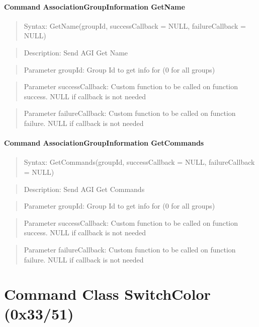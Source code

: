 \paragraph{Command AssociationGroupInformation GetName}
\begin{quote}Syntax: GetName(groupId, successCallback = NULL, failureCallback = NULL)\end{quote}
\begin{quote}Description: Send AGI Get Name\end{quote}
\begin{quote}Parameter groupId: Group Id to get info for (0 for all groups)\end{quote}
\begin{quote}Parameter successCallback: Custom function to be called on function success. NULL if callback is not needed\end{quote}
\begin{quote}Parameter failureCallback: Custom function to be called on function failure. NULL if callback is not needed\end{quote}


\paragraph{Command AssociationGroupInformation GetCommands}
\begin{quote}Syntax: GetCommands(groupId, successCallback = NULL, failureCallback = NULL)\end{quote}
\begin{quote}Description: Send AGI Get Commands\end{quote}
\begin{quote}Parameter groupId: Group Id to get info for (0 for all groups)\end{quote}
\begin{quote}Parameter successCallback: Custom function to be called on function success. NULL if callback is not needed\end{quote}
\begin{quote}Parameter failureCallback: Custom function to be called on function failure. NULL if callback is not needed\end{quote}



\section{Command Class SwitchColor (0x33/51)}

